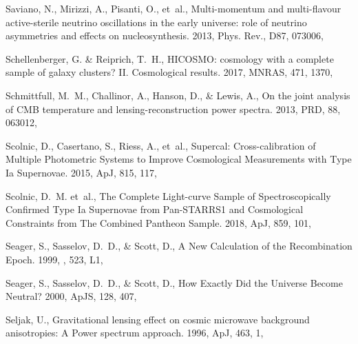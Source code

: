 \documentclass[longauth,traditabstract]{aa}
\def\apj{{ApJ}}
\def\mnras{{MNRAS}}
\def\apjs{{ApJS}}
\def\prd{{PRD}}
\begin{document}
\begin{thebibliography}{379}
Saviano, N., Mirizzi, A., Pisanti, O., {et~al.}, {Multi-momentum and
  multi-flavour active-sterile neutrino oscillations in the early universe:
  role of neutrino asymmetries and effects on nucleosynthesis}. 2013, Phys.
  Rev., D87, 073006, 

Schellenberger, G. \& Reiprich, T.~H., {HICOSMO: cosmology with a complete
  sample of galaxy clusters? II. Cosmological results}. 2017, \mnras, 471,
  1370, 

Schmittfull, M.~M., Challinor, A., Hanson, D., \& Lewis, A., {On the joint
  analysis of CMB temperature and lensing-reconstruction power spectra}. 2013,
  \prd, 88, 063012, 

{Scolnic}, D., {Casertano}, S., {Riess}, A., {et~al.}, {Supercal:
  Cross-calibration of Multiple Photometric Systems to Improve Cosmological
  Measurements with Type Ia Supernovae}. 2015, \apj, 815, 117,

Scolnic, D.~M. {et~al.}, {The Complete Light-curve Sample of Spectroscopically
  Confirmed Type Ia Supernovae from Pan-STARRS1 and Cosmological Constraints
  from The Combined Pantheon Sample}. 2018, \apj, 859, 101, 

Seager, S., Sasselov, D.~D., \& Scott, D., {A New Calculation of the
  Recombination Epoch}. 1999, \apjl, 523, L1, 

{Seager}, S., {Sasselov}, D.~D., \& {Scott}, D., {How Exactly Did the Universe
  Become Neutral?} 2000, \apjs, 128, 407, 

Seljak, U., {Gravitational lensing effect on cosmic microwave background
  anisotropies: A Power spectrum approach}. 1996, \apj, 463, 1,


\end{thebibliography}
\end{document}
